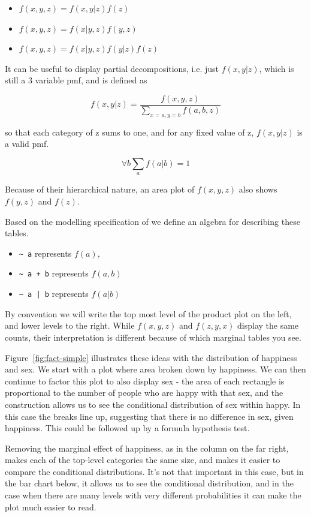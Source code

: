 \documentclass[letterpaper,oneside]{scrartcl}
\begin{document}
\begin{itemize}
  \item $f(x, y, z) = f(x, y | z) f(z)$
  \item $f(x, y, z) = f(x | y, z) f(y, z)$
  \item $f(x, y, z) = f(x | y, z) f(y | z) f(z)$
\end{itemize}

It can be useful to display partial decompositions, i.e. just $f(x, y | z)$, which is still a 3 variable pmf, and is defined as 

\[ f(x, y | z) = \frac{f(x, y, z)}{\sum_{x = a, y = b} f(a, b, z)} \]

so that each category of z sums to one, and for any fixed value of z, $f(x, y | z)$ is a valid pmf.

\[ \forall b \sum_a f(a | b) = 1 \]

Because of their hierarchical nature, an area plot of $f(x, y, z)$ also shows $f(y, z)$ and $f(z)$.  

Based on the modelling specification of \citet{wilkinson:1973} we define an algebra for describing these tables.  

\begin{itemize}
  \item \verb|~ a| represents $f(a)$,
  \item \verb|~ a + b| represents $f(a, b)$
  \item \verb!~ a | b! represents $f(a | b)$
\end{itemize}

By convention we will write the top most level of the product plot on the left, and lower levels to the right.  While $f(x, y, z)$ and $f(z, y, x)$ display the same counts, their interpretation is different because of which marginal tables you see.

Figure~\ref{fig:fact-simple} illustrates these ideas with the distribution of happiness and sex. We start with a plot where area broken down by happiness. We can then continue to factor this plot to also display sex - the area of each rectangle is proportional to the number of people who are happy with that sex, and the construction allows us to see the conditional distribution of sex within happy. In this case the breaks line up, suggesting that there is no difference in sex, given happiness.  This could be followed up by a formula hypothesis test.

Removing the marginal effect of happiness, as in the column on the far right, makes each of the top-level categories the same size, and makes it easier to compare the conditional distributions.  It's not that important in this case, but in the bar chart below, it allows us to see the conditional distribution, and in the case when there are many levels with very different probabilities it can make the plot much easier to read.
\end{document}

